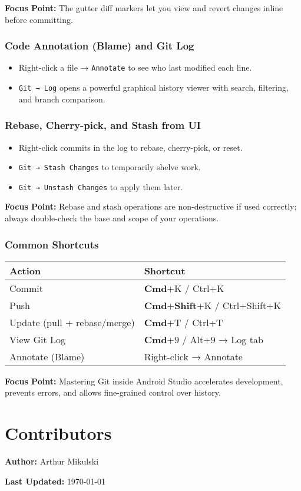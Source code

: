 \documentclass[a4paper,12pt]{article}
\begin{document}
\textbf{Focus Point:} The gutter diff markers let you view and revert changes inline before committing.

\subsubsection{Code Annotation (Blame) and Git Log}

\begin{itemize}
  \item Right-click a file → \texttt{Annotate} to see who last modified each line.
  \item \texttt{Git → Log} opens a powerful graphical history viewer with search, filtering, and branch comparison.
\end{itemize}

\subsubsection{Rebase, Cherry-pick, and Stash from UI}

\begin{itemize}
  \item Right-click commits in the log to rebase, cherry-pick, or reset.
  \item \texttt{Git → Stash Changes} to temporarily shelve work.
  \item \texttt{Git → Unstash Changes} to apply them later.
\end{itemize}

\textbf{Focus Point:} Rebase and stash operations are non-destructive if used correctly; always double-check the base and scope of your operations.

\subsubsection{Common Shortcuts}

\begin{tabular}{|l|l|}
\hline
\textbf{Action} & \textbf{Shortcut} \\
\hline
Commit & \textbf{Cmd}+K / Ctrl+K \\
Push & \textbf{Cmd}+\textbf{Shift}+K / Ctrl+Shift+K \\
Update (pull + rebase/merge) & \textbf{Cmd}+T / Ctrl+T \\
View Git Log & \textbf{Cmd}+9 / Alt+9 → Log tab \\
Annotate (Blame) & Right-click → Annotate \\
\hline
\end{tabular}

\textbf{Focus Point:} Mastering Git inside Android Studio accelerates development, prevents errors, and allows fine-grained control over history.

\clearpage
\section*{Contributors}

\textbf{Author:} Arthur Mikulski

\textbf{Last Updated:} \today
\end{document}
